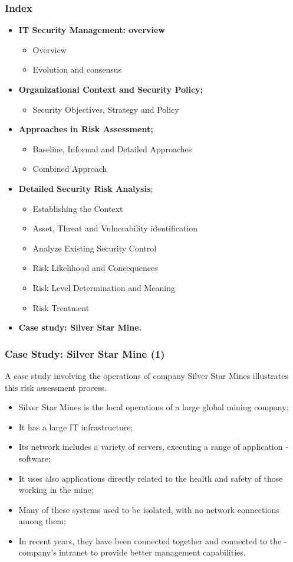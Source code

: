 \documentclass[xcolor ={table,usenames,dvipsnames}]{beamer}
\theoremstyle{definition}
\begin{document}
	\begin{frame}
		\frametitle{Index}
		\begin{itemize}
			\item <0> \textbf{IT Security Management: overview}
			\begin{itemize}
				\item Overview
				\item Evolution and consensus
			\end{itemize}
			\item <0>  \textbf{Organizational Context and Security Policy;}
			\begin{itemize}
				\item Security Objectives, Strategy and Policy
			\end{itemize}
			\item <0>  \textbf{Approaches in Risk Assessment;}
			\begin{itemize}
				\item Baseline, Informal and Detailed Approaches
				\item Combined Approach
			\end{itemize}
			\item <0> \textbf{Detailed Security Risk Analysis};
			\begin{itemize}
				\item Establishing the Context
				\item Asset, Threat and Vulnerability identification
				\item Analyze Existing Security Control
				\item Risk Likelihood and Concequences
				\item Risk Level Determination and Meaning
				\item Risk Treatment
			\end{itemize}
			\item <1> \textbf{Case study: Silver Star Mine.}
		\end{itemize}
	\end{frame}
	
	\begin{frame}
		\frametitle{Case Study: Silver Star Mine (1)}
		A case study involving the operations of  company Silver Star Mines illustrates this risk assessment process. 
		\begin{itemize}
			\item Silver Star Mines is the local operations of a large global
			mining company;
			\item It has a large IT infrastructure;
			\item Its network includes a variety of servers, executing a range of ­application ­software;
			\item It uses also applications directly related to the health and safety of those working in the mine;
			\item Many of these systems used to be isolated, with no network connections among them;
			\item In recent years, they have been connected together and connected to the ­company’s intranet to provide better management capabilities. 
		\end{itemize}
	\end{frame}
\end{document}

